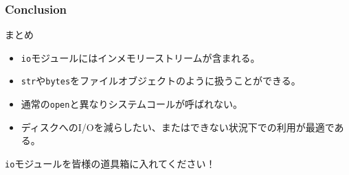 \documentclass[aspectratio=169,dvipdfmx,14pt,notheorems]{beamer}
\theoremstyle{definition}
\begin{document}
\begin{frame}[fragile]\frametitle{Conclusion}
\begin{block}{まとめ}
\begin{itemize}
\item \texttt{io}モジュールにはインメモリーストリームが含まれる。
\item \texttt{str}や\texttt{bytes}をファイルオブジェクトのように扱うことができる。
\item 通常の\texttt{open}と異なりシステムコールが呼ばれない。
\item ディスクへのI/Oを減らしたい、またはできない状況下での利用が最適である。
\end{itemize}
\end{block}
\texttt{io}モジュールを皆様の道具箱に入れてください！
\end{frame}
\end{document}
